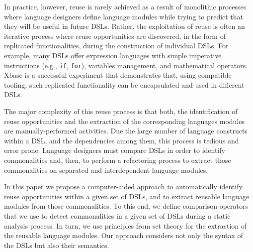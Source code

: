 In practice, however, reuse is rarely achieved as a result of monolithic processes where language designers define language modules while trying to predict that they will be useful in future DSLs. Rather, the exploitation of reuse is often an iterative process where reuse opportunities are discovered, in the form of replicated functionalities, during the construction of individual DSLs. For example, many DSLs offer expression languages with simple imperative instructions (e.g., \texttt{if}, \texttt{for}), variables management, and mathematical operators. Xbase \cite{Bettini:2013} is a successful experiment that demonstrates that, using compatible tooling, such replicated functionality can be encapsulated and used in different DSLs.

The major complexity of this reuse process is that both, the identification of reuse opportunities and the extraction of the corresponding languages modules are manually-performed activities. Due the large number of language constructs within a DSL, and the dependencies among them, this process is tedious and error prone. Language designers must compare DSLs in order to identify commonalities and, then, to perform a refactoring process to extract those commonalities on separated and interdependent language modules. %

In this paper we propose a computer-aided approach to automatically identify reuse opportunities within a given set of DSLs, and to extract reusable language modules from those commonalities. To this end, we define comparison operators that we use to detect commonalities in a given set of DSLs during a static analysis process. In turn, we use principles from set theory for the extraction of the reusable language modules. Our approach considers not only the syntax of the DSLs but also their semantics.


